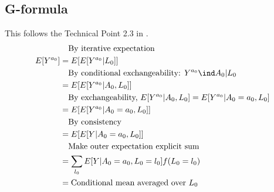 \documentclass[dvipdfmx,10pt]{article}
\begin{document}
\subsection{G-formula}
\label{sec:org64aa61f}
This follows the Technical Point 2.3 in \cite{hernanCausalInference2019}.
\begin{align*}
  &~~~\text{By iterative expectation}\\
  E[Y^{a_{0}}]
  &= E[E[Y^{a_{0}} | L_{0}]]\\
  &~~~\text{By conditional exchangeability: } Y^{a_{0}} \ind A_{0} | L_{0}\\
  &= E[E[Y^{a_{0}} | A_{0}, L_{0}]]\\
  &~~~\text{By exchangeability, }E[Y^{a_{0}} | A_{0}, L_{0}] = E[Y^{a_{0}} | A_{0} = a_{0}, L_{0}]\\
  &= E[E[Y^{a_{0}} | A_{0} = a_{0}, L_{0}]]\\
  &~~~\text{By consistency}\\
  &= E[E[Y | A_{0} = a_{0}, L_{0}]]\\
  &~~~\text{Make outer expectation explicit sum}\\
  &= \sum_{l_{0}} E[Y | A_{0} = a_{0}, L_{0} = l_{0}] f(L_{0} = l_{0})\\
  &= \text{Conditional mean averaged over $L_{0}$}\\
\end{align*}
\end{document}
